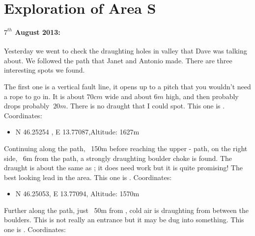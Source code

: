 \section{Exploration of Area S}

\begin{marginfigure}
\end{marginfigure}
\paragraph{$7^{th}$ August 2013: } Yesterday we went to check the draughting holes in  valley that Dave was talking about. We followed the path that Janet and Antonio made. There are three interesting spots we found.

The first one is a vertical fault line, it opens up to a pitch that you wouldn't need a rope to go in. It is about $70cm$ wide and about $6m$ high, and then probably drops probably $~20m$. There is no draught that I could spot.
This one is . Coordinates:

\begin{itemize}
	\item N 46.25254 , E 13.77087,Altitude: 1627m
\end{itemize}


Continuing along the path, ~150m before reaching the upper - path, on the right side, ~6m from the path, a strongly draughting boulder choke is found. The draught is about the same as ; it does need work but it is quite promising! The best looking lead in the area.
This one is . Coordinates:

\begin{itemize}
	\item N 46.25053, E 13.77094, Altitude: 1570m
\end{itemize}

Further along the path, just ~50m from , cold air is draughting from between the boulders. This is not really an entrance but it may be dug into something. This one is . Coordinates:


